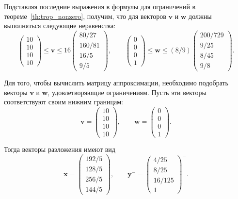 \documentclass[specialist,
               substylefile = spbu.rtx,
               subf,href,colorlinks=true, 12pt]{disser}
\theoremstyle{definition}
\begin{document}
Подставляя последние выражения в формулы для ограничений в теореме~\ref{th:trop_nonzero}, получим, что для векторов $\bm{v}$ и $\bm{w}$ должны выполняться следующие неравенства:
\begin{equation*}
\begin{pmatrix}
10\\10\\10\\10
\end{pmatrix}
\leq
\bm{v}
\leq
16
\begin{pmatrix}
80/27\\
160/81\\16/5\\9/5
\end{pmatrix},
\qquad
\begin{pmatrix}
0\\0\\0\\1
\end{pmatrix}
\leq
\bm{w}
\leq
(8/9)
\begin{pmatrix}
200/729\\9/25\\8/45\\9/8
\end{pmatrix}.
\end{equation*}
 
Для того, чтобы вычислить матрицу аппроксимации, необходимо подобрать векторы $\bm{v}$ и $\bm{w}$, удовлетворяющие ограничениям. Пусть эти векторы соответствуют своим нижним границам:
\begin{equation*}
\bm{v}
=
\begin{pmatrix}
10\\10\\10\\10
\end{pmatrix},
\qquad
\bm{w}
=
\begin{pmatrix}
0\\
0\\
0\\
1
\end{pmatrix}.
\end{equation*}

Тогда векторы разложения имеют вид
\begin{equation*}
\bm{x}
=
\begin{pmatrix}
192/5\\128/5\\256/5\\144/5
\end{pmatrix},
\qquad
\bm{y}^{-}
=
\begin{pmatrix}
4/25\\8/25\\16/125\\1
\end{pmatrix}^{-}.
\end{equation*}
\end{document}
